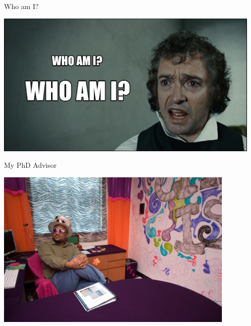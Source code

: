 \documentclass{beamer}
\date{}
\begin{document}
\begin{frame}
  \titlepage
\end{frame}

\begin{frame}[fragile]{Who am I?}

\begin{center}
\includegraphics[height=2.75in]{jean-val-jean.jpg}
\end{center}


\end{frame}

\begin{frame}[fragile]{My PhD Advisor}

\begin{center}
\includegraphics[height=3in]{charles-tenure.jpg}
\end{center}


\end{frame}
\end{document}

